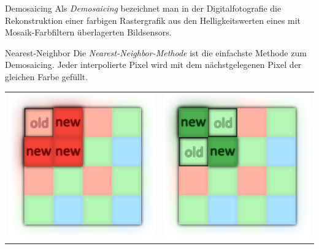 \begin{defi}{Demosaicing}
    Als \emph{Demosaicing} bezeichnet man in der Digitalfotografie die Rekonstruktion einer farbigen Rastergrafik aus den Helligkeitswerten eines mit Mosaik-Farbfiltern überlagerten Bildsensors.
\end{defi}

\begin{defi}[Demosaicing]{Nearest-Neighbor}
    Die \emph{Nearest-Neighbor-Methode} ist die einfachste Methode zum Demosaicing.
    Jeder interpolierte Pixel wird mit dem nächstgelegenen Pixel der gleichen Farbe gefüllt.

    \centering
    \begin{tabular}{cc}
        \includegraphics[width=0.15\linewidth]{figures/demosaicing-nearest-neighbour-red-blue.png} &
        \includegraphics[width=0.15\linewidth]{figures/demosaicing-nearest-neighbour-green.png}
    \end{tabular}
\end{defi}

